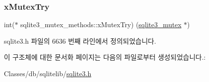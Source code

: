 \subsubsection{\texorpdfstring{x\+Mutex\+Try}{xMutexTry}}
{\footnotesize\ttfamily int($\ast$ sqlite3\+\_\+mutex\+\_\+methods\+::x\+Mutex\+Try) (\hyperlink{sqlite3_8h_a0f546860bde03fddb33a9fed920da05c}{sqlite3\+\_\+mutex} $\ast$)}



sqlite3.\+h 파일의 6636 번째 라인에서 정의되었습니다.



이 구조체에 대한 문서화 페이지는 다음의 파일로부터 생성되었습니다.\+:\begin{DoxyCompactItemize}
\item 
Classes/db/sqlitelib/\hyperlink{sqlite3_8h}{sqlite3.\+h}\end{DoxyCompactItemize}
